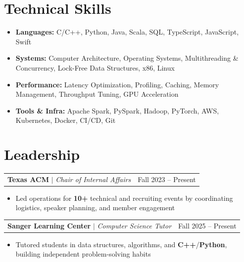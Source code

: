 \documentclass[letterpaper,10pt]{article}
\makeatletter
\newcommand{\resumeWorkHeading}[2]{%
  \vspace{2pt}\noindent
  \begin{tabular*}{\textwidth}{@{}l@{\extracolsep{\fill}}r@{}}
    #1 & #2 \\
  \end{tabular*}%
  \vspace{-2pt}
}
\newcommand{\resumeItemListStart}{\begin{itemize}}
\newcommand{\resumeItemListEnd}{\end{itemize}\vspace{3pt}}
\newcommand{\resumeItem}[1]{\item #1}
\makeatother
\begin{document}
\section{Technical Skills}
\begin{itemize}[leftmargin=0em,label={},itemsep=1pt,parsep=0pt,topsep=2pt]
\item \textbf{Languages:} C/C++, Python, Java, Scala, SQL, TypeScript, JavaScript, Swift
\item \textbf{Systems:} Computer Architecture, Operating Systems, Multithreading \& Concurrency, Lock-Free Data Structures, x86, Linux
\item \textbf{Performance:} Latency Optimization, Profiling, Caching, Memory Management, Throughput Tuning, GPU Acceleration
\item \textbf{Tools \& Infra:} Apache Spark, PySpark, Hadoop, PyTorch, AWS, Kubernetes, Docker, CI/CD, Git
\end{itemize}

\section{Leadership}
\resumeWorkHeading
{\textbf{Texas ACM} $|$ \emph{Chair of Internal Affairs}}{Fall 2023 -- Present}
\resumeItemListStart
\resumeItem{Led operations for \textbf{10+} technical and recruiting events by coordinating logistics, speaker planning, and member engagement}
\resumeItemListEnd

\resumeWorkHeading
{\textbf{Sanger Learning Center} $|$ \emph{Computer Science Tutor}}{Fall 2025 -- Present}
\resumeItemListStart
\resumeItem{Tutored students in data structures, algorithms, and \textbf{C++}/\textbf{Python}, building independent problem-solving habits}
\resumeItemListEnd
\end{document}
